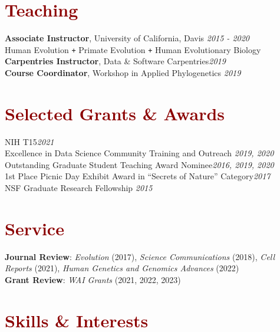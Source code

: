 \documentclass[11pt,margin,line]{resume}
\begin{document}
\begin{resume}
\vspace{-1.5mm}
\section{\large\textcolor{DarkRed}{Teaching}}
\textbf{Associate Instructor}, University of California, Davis \hfill \emph{2015  - 2020}
\\Human Evolution \texttt{+} Primate Evolution \texttt{+} Human Evolutionary Biology
\\\textbf{Carpentries Instructor}, Data \& Software Carpentries\hfill \emph{2019}
\\\textbf{Course Coordinator}, Workshop in Applied Phylogenetics \hfill \emph{2019}

\section{\large\textcolor{DarkRed}{Selected Grants \& Awards}}
NIH T15\hfill \emph{2021}\\
Excellence in Data Science Community Training and Outreach \hfill \emph{2019, 2020}\\
Outstanding Graduate Student Teaching Award Nominee\hfill \emph{2016, 2019, 2020}\\
1st Place Picnic Day Exhibit Award in “Secrets of Nature” Category\hfill \emph{2017}\\
NSF Graduate Research Fellowship \hfill \emph{2015}\\

\vspace{-5mm}
\section{\large\textcolor{DarkRed}{Service}}
\textbf{Journal Review}: \emph{Evolution} (2017),  \emph{Science Communications} (2018),  \emph{Cell Reports} (2021), \emph{Human Genetics and Genomics Advances} (2022)\\
\textbf{Grant Review}: \emph{WAI Grants} (2021,  2022,  2023)

\section{\large\textcolor{DarkRed}{Skills \& Interests}}



\end{resume}
\end{document}
